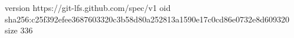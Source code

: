 version https://git-lfs.github.com/spec/v1
oid sha256:c25f392efee3687603320c3b58d80a252813a1590e17c0cd86e0732e8d609320
size 336
